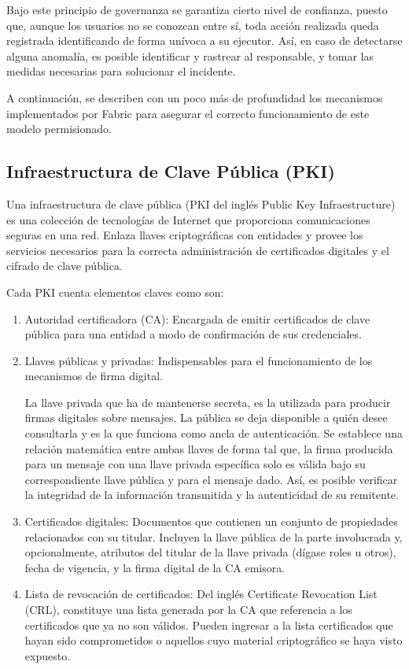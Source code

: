 Bajo este principio de governanza se garantiza cierto nivel de confianza, puesto que, aunque los usuarios no se conozcan entre s\'i, toda acci\'on realizada queda registrada identificando de forma un\'ivoca a su ejecutor. As\'i, en caso de detectarse alguna anomal\'ia, es posible identificar y rastrear al responsable, y tomar las medidas necesarias para solucionar el incidente.

A continuaci\'on, se describen con un poco m\'as de profundidad los mecanismos implementados por Fabric para asegurar el correcto funcionamiento de este modelo permisionado.

\subsection{Infraestructura de Clave P\'ublica (PKI)}
Una infraestructura de clave p\'ublica (PKI del ingl\'es Public Key Infraestructure) es una colección de tecnolog\'ias de Internet que proporciona comunicaciones seguras en una red. Enlaza llaves criptogr\'aficas con entidades y provee los servicios necesarios para la correcta administraci\'on de certificados digitales y el cifrado de clave p\'ublica.

Cada PKI cuenta elementos claves como son:
\begin{enumerate}
	\item Autoridad certificadora (CA): Encargada de emitir certificados de clave p\'ublica para una entidad a modo de confirmaci\'on de sus credenciales.
	
	\item Llaves p\'ublicas y privadas: Indispensables para el funcionamiento de los mecanismos de firma digital.
	
	La llave privada que ha de mantenerse secreta, es la utilizada para producir firmas digitales sobre mensajes. La p\'ublica se deja disponible a qui\'en desee consultarla y es la que funciona como ancla de autenticaci\'on. Se establece una relaci\'on matem\'atica entre ambas llaves de forma tal que, la firma producida para un mensaje con una llave privada espec\'ifica solo es v\'alida bajo su correspondiente llave p\'ublica y para el mensaje dado. As\'i, es posible verificar la integridad de la informaci\'on transmitida y la autenticidad de su remitente.
	
	\item Certificados digitales: Documentos que contienen un conjunto de propiedades relacionados con su titular. Incluyen la llave p\'ublica de la parte involucrada y, opcionalmente, atributos del titular de la llave privada (d\'igase roles u otros), fecha de vigencia, y la firma digital de la CA emisora.
	
	\item Lista de revocaci\'on de certificados: Del ingl\'es Certificate Revocation List (CRL), constituye una lista generada por la CA que referencia a los certificados que ya no son v\'alidos. Pueden ingresar a la lista certificados que hayan sido comprometidos o aquellos cuyo material criptogr\'afico se haya visto expuesto.
	
\end{enumerate}

